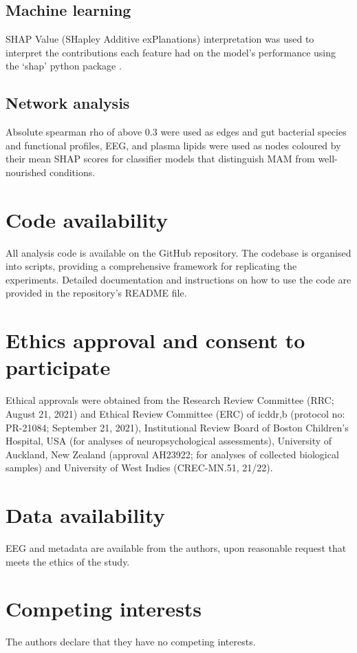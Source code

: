 \documentclass{article}
\begin{document}
\subsection*{Machine learning}
SHAP Value (SHapley Additive exPlanations) interpretation was used to interpret the contributions each feature had on the model's performance using the ‘shap’ python package \cite{lundberg2017unified}.

\subsection*{Network analysis}
Absolute spearman rho of above 0.3 were used as edges and gut bacterial species and functional profiles, EEG, and plasma lipids were used as nodes coloured by their mean SHAP scores for classifier models that distinguish \gls{MAM} from well-nourished conditions.

\section*{Code availability}
All analysis code is available on the GitHub repository.
The codebase is organised into scripts, providing a comprehensive framework for replicating the experiments.
Detailed documentation and instructions on how to use the code are provided in the repository's README file.

\section*{Ethics approval and consent to participate}
Ethical approvals were obtained from the Research Review Committee (RRC; August 21, 2021) and Ethical Review Committee (ERC) of icddr,b (protocol no: PR-21084; September 21, 2021), Institutional Review Board of Boston Children’s Hospital, USA (for analyses of neuropsychological assessments), University of Auckland, New Zealand (approval AH23922; for analyses of collected biological samples) and University of West Indies (CREC-MN.51, 21/22).

\section*{Data availability}
EEG and metadata are available from the authors, upon reasonable request that meets the ethics of the study.

\section*{Competing interests}
The authors declare that they have no competing interests.
\end{document}

